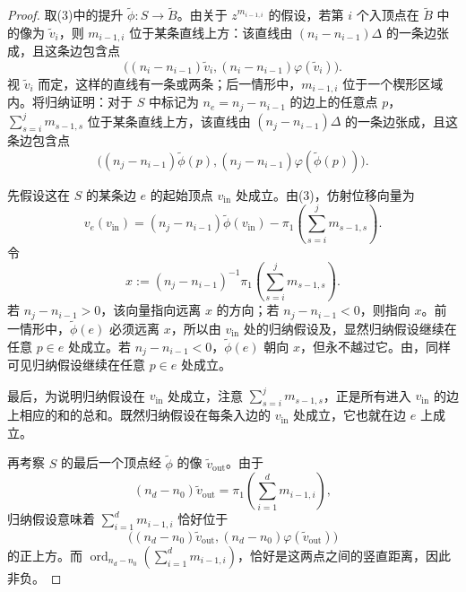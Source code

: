 \begin{proof}
取(3)中的提升 $\widetilde\phi\colon S\to\widetilde B$。由关于 $z^{m_{i-1,i}}$ 的假设，若第 $i$ 个入顶点在 $\widetilde B$ 中的像为 $\widetilde v_i$，则 $m_{i-1,i}$ 位于某条直线上方：该直线由 $(n_i-n_{i-1})\Delta$ 的一条边张成，且这条边包含点
\[
\bigl((n_i-n_{i-1})\widetilde v_i,
(n_i-n_{i-1})\varphi(\widetilde v_i)\bigr).
\]
视 $\widetilde v_i$ 而定，这样的直线有一条或两条；后一情形中，$m_{i-1,i}$ 位于一个楔形区域内。将归纳证明：对于 $S$ 中标记为 $n_e=n_j-n_{i-1}$ 的边上的任意点 $p$，$\sum_{s=i}^jm_{s-1,s}$ 位于某条直线上方，该直线由 $(n_j-n_{i-1})\Delta$ 的一条边张成，且这条边包含点
\[
\bigl((n_j-n_{i-1})\widetilde\phi(p),
(n_j-n_{i-1})\varphi(\widetilde\phi(p))\bigr).
\]

先假设这在 $S$ 的某条边 $e$ 的起始顶点 $v_{\mathrm{in}}$ 处成立。由(3)，仿射位移向量为
\[
v_e(v_{\mathrm{in}})=(n_j-n_{i-1})\widetilde\phi(v_{\mathrm{in}})
-\pi_1\left(\sum_{s=i}^jm_{s-1,s}\right).
\]
令
\[
x:=(n_j-n_{i-1})^{-1}\pi_1\left(\sum_{s=i}^jm_{s-1,s}\right).
\]
若 $n_j-n_{i-1}>0$，该向量指向远离 $x$ 的方向；若 $n_j-n_{i-1}<0$，则指向 $x$。前一情形中，$\widetilde\phi(e)$ 必须远离 $x$，所以由 $v_{\mathrm{in}}$ 处的归纳假设及，显然归纳假设继续在任意 $p\in e$ 处成立。若 $n_j-n_{i-1}<0$，$\widetilde\phi(e)$ 朝向 $x$，但永不越过它。由，同样可见归纳假设继续在任意 $p\in e$ 处成立。

最后，为说明归纳假设在 $v_{\mathrm{in}}$ 处成立，注意 $\sum_{s=i}^jm_{s-1,s}$，正是所有进入 $v_{\mathrm{in}}$ 的边上相应的和的总和。既然归纳假设在每条入边的 $v_{\mathrm{in}}$ 处成立，它也就在边 $e$ 上成立。

再考察 $S$ 的最后一个顶点经 $\widetilde\phi$ 的像 $\widetilde v_{\mathrm{out}}$。由于
\[
(n_d-n_0)\widetilde v_{\mathrm{out}}
=\pi_1\left(\sum_{i=1}^dm_{i-1,i}\right),
\]
归纳假设意味着 $\sum_{i=1}^dm_{i-1,i}$ 恰好位于
\[
\bigl((n_d-n_0)\widetilde v_{\mathrm{out}},
(n_d-n_0)\varphi(\widetilde v_{\mathrm{out}})\bigr)
\]
的正上方。而 $\operatorname{ord}_{n_d-n_0}(\sum_{i=1}^dm_{i-1,i})$，恰好是这两点之间的竖直距离，因此非负。
\end{proof}

